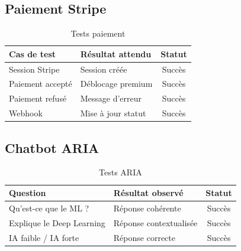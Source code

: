 \documentclass[12pt, a4paper]{report}
\begin{document}
\subsection{Paiement Stripe}
\begin{table}[H]
\centering
\caption{Tests paiement}
\begin{tabularx}{\textwidth}{|p{4cm}|X|c|}
\hline
\textbf{Cas de test} & \textbf{Résultat attendu} & \textbf{Statut} \\
\hline
Session Stripe & Session créée & Succès \\
\hline
Paiement accepté & Déblocage premium & Succès \\
\hline
Paiement refusé & Message d'erreur & Succès \\
\hline
Webhook & Mise à jour statut & Succès \\
\hline
\end{tabularx}
\end{table}

\subsection{Chatbot ARIA}
\begin{table}[H]
\centering
\caption{Tests ARIA}
\begin{tabularx}{\textwidth}{|p{5cm}|X|c|}
\hline
\textbf{Question} & \textbf{Résultat observé} & \textbf{Statut} \\
\hline
Qu'est-ce que le ML ? & Réponse cohérente & Succès \\
\hline
Explique le Deep Learning & Réponse contextualisée & Succès \\
\hline
IA faible / IA forte & Réponse correcte & Succès \\
\hline
\end{tabularx}
\end{table}
\end{document}
